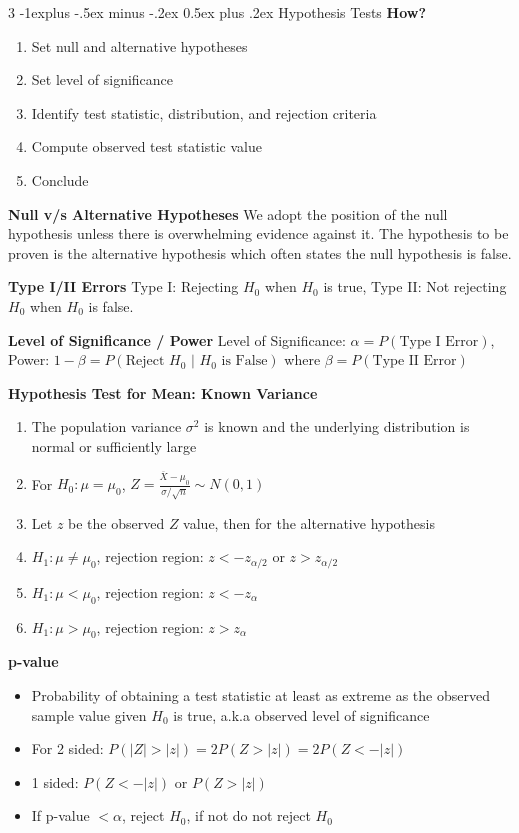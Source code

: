 \documentclass[10pt, landscape]{article}
\makeatletter
\renewcommand{\section}{\@startsection{section}{1}{0mm}%
                                {-1ex plus -.5ex minus -.2ex}%
                                {0.5ex plus .2ex}%
                                {\normalfont\large\bfseries}}
\renewcommand{\section}{\@startsection{section}{2}{0mm}%
                                {-1explus -.5ex minus -.2ex}%
                                {0.5ex plus .2ex}%
                                {\normalfont\normalsize\bfseries}}
\makeatother
\begin{document}
\begin{multicols*}{3}
\section{Hypothesis Tests}
\textbf{How?}
\begin{enumerate}
    \item Set null and alternative hypotheses
    \item Set level of significance
    \item Identify test statistic, distribution, and rejection criteria
    \item Compute observed test statistic value
    \item Conclude
\end{enumerate}

\textbf{Null v/s Alternative Hypotheses}
We adopt the position of the null hypothesis unless there is overwhelming evidence against it. The hypothesis to be proven is the alternative hypothesis which often states the null hypothesis is false.

\textbf{Type I/II Errors}
Type I: Rejecting $H_0$ when $H_0$ is true, Type II: Not rejecting $H_0$ when $H_0$ is false.

\textbf{Level of Significance / Power}
Level of Significance: $\alpha=P(\text{Type I Error})$, Power: $1-\beta=P(\text{Reject $H_0$ | $H_0$ is False})$ where $\beta=P(\text{Type II Error})$

\textbf{Hypothesis Test for Mean: Known Variance}
\begin{enumerate}
    \item The population variance $\sigma^2$ is known and the underlying distribution is normal or sufficiently large
    \item For $H_0:\mu=\mu_0$, $Z=\frac{\overline{X}-\mu_0}{\sigma/\sqrt{n}}\sim N(0,1)$
    \item Let $z$ be the observed $Z$ value, then for the alternative hypothesis
    \item $H_1:\mu\neq\mu_0$, rejection region: $z<-z_{\alpha/2}$ or $z>z_{\alpha/2}$
    \item $H_1:\mu<\mu_0$, rejection region: $z<-z_\alpha$
    \item $H_1:\mu>\mu_0$, rejection region: $z>z_\alpha$
\end{enumerate}

\textbf{p-value}
\begin{itemize}
    \item Probability of obtaining a test statistic at least as extreme as the observed sample value given $H_0$ is true, a.k.a observed level of significance
    \item For 2 sided: $P(|Z|>|z|)=2P(Z>|z|)=2P(Z<-|z|)$
    \item 1 sided: $P(Z<-|z|)$ or $P(Z>|z|)$
    \item If p-value $< \alpha$, reject $H_0$, if not do not reject $H_0$
\end{itemize}


\end{multicols*}
\end{document}
